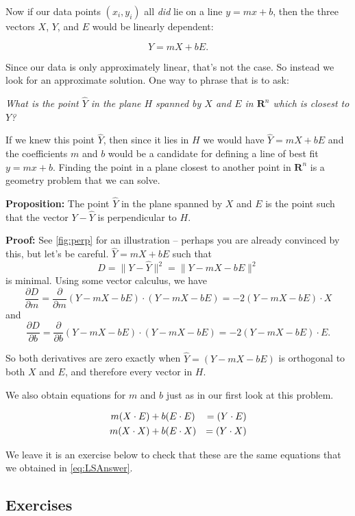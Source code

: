 \documentclass[
  oneside]{scrbook}
\begin{document}
Now if our data points \((x_i,y_i)\) all \emph{did} lie on a line
\(y=mx+b\), then the three vectors \(X\), \(Y\), and \(E\) would be
linearly dependent:

\[ Y = mX + bE.  \]

Since our data is only approximately linear, that's not the case. So
instead we look for an approximate solution. One way to phrase that is
to ask:

\emph{What is the point \(\hat{Y}\) in the plane \(H\) spanned by \(X\)
and \(E\) in \(\mathbf{R}^{n}\) which is closest to \(Y\)?}

If we knew this point \(\hat{Y}\), then since it lies in \(H\) we would
have \(\hat{Y}=mX+bE\) and the coefficients \(m\) and \(b\) would be a
candidate for defining a line of best fit \(y=mx+b\). Finding the point
in a plane closest to another point in \(\mathbf{R}^{n}\) is a geometry
problem that we can solve.

\textbf{Proposition:} The point \(\hat{Y}\) in the plane spanned by
\(X\) and \(E\) is the point such that the vector \(Y-\hat{Y}\) is
perpendicular to \(H\).

\textbf{Proof:} See \cref{fig:perp} for an illustration -- perhaps you
are already convinced by this, but let's be careful. \(\hat{Y}=mX+bE\)
such that \[ D = \|Y-\hat{Y}\|^2 = \|Y-mX-bE\|^2 \] is minimal. Using
some vector calculus, we have \[ \frac{\partial D}{\partial m} =
\frac{\partial}{\partial m} (Y-mX-bE)\cdot (Y-mX-bE) =
-2(Y-mX-bE)\cdot X \] and \[ \frac{\partial D}{\partial b} =
\frac{\partial}{\partial b} (Y-mX-bE)\cdot (Y-mX-bE) =
-2(Y-mX-bE)\cdot E.  \]

So both derivatives are zero exactly when \(\hat{Y}=(Y-mX-bE)\) is
orthogonal to both \(X\) and \(E\), and therefore every vector in \(H\).

We also obtain equations for \(m\) and \(b\) just as in our first look
at this problem.

\begin{equation} \begin{aligned} m(X\cdot E) &+ b(E\cdot E) &= (Y\cdot E) \cr
m(X\cdot X) &+ b(E\cdot X) &= (Y\cdot X) \cr \end{aligned}
\label{eq:LSAnswer2}\end{equation}

We leave it is an exercise below to check that these are the same
equations that we obtained in \cref{eq:LSAnswer}.

\hypertarget{exercises}{%
\subsection{Exercises}\label{exercises}}
\end{document}

